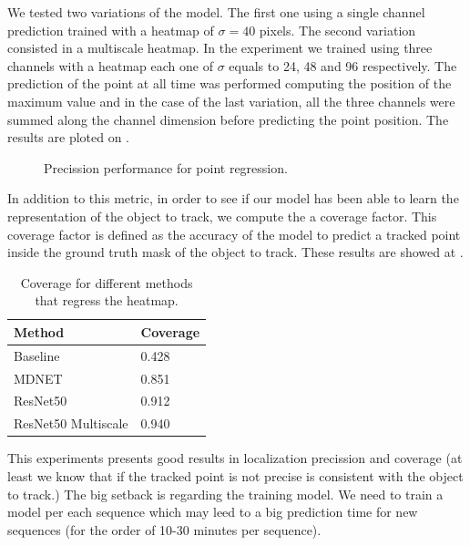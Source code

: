 We tested two variations of the model. The first one using a single channel prediction trained with a heatmap of $\sigma = 40$ pixels.
The second variation consisted in a multiscale heatmap. In the experiment we trained using three channels with a heatmap each one of $\sigma$ equals to 24, 48 and 96 respectively.
The prediction of the point at all time was performed computing the position of the maximum value and in the case of the last variation, all the three channels were summed along the channel dimension before predicting the point position. The results are ploted on .

\begin{figure}[h]
	\centering
	
  \label{fig:tracking_point_regression}
	\caption{Precission performance for point regression.}
\end{figure}

In addition to this metric, in order to see if our model has been able to learn the representation of the object to track, we compute the a coverage factor.
This coverage factor is defined as the accuracy of the model to predict a tracked point inside the ground truth mask of the object to track.
These results are showed at .

\begin{table}[h]
  \centering
  \begin{tabular}{l|l}
    \toprule
    Method              & Coverage \\
    \midrule
    Baseline            & 0.428    \\
    MDNET               & 0.851    \\
    ResNet50            & 0.912    \\
    ResNet50 Multiscale & 0.940    \\
    \bottomrule
  \end{tabular}
  \caption{Coverage for different methods that regress the heatmap. }
  \label{tab:coverage_tracking_heatmap}
\end{table}

This experiments presents good results in localization precission and coverage (at least we know that if the tracked point is not precise is consistent with the object to track.)
The big setback is regarding the training model. We need to train a model per each sequence which may leed to a big prediction time for new sequences (for the order of 10-30 minutes per sequence).

